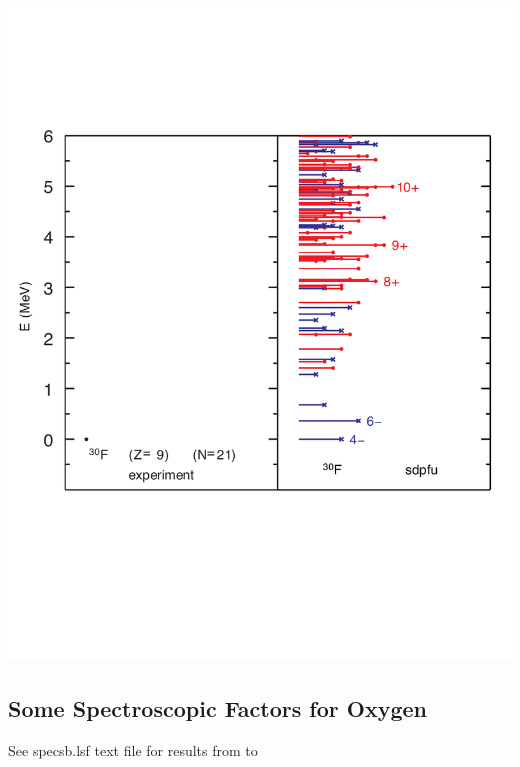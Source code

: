 \documentclass[12pt]{article}
\begin{document}
\includegraphics[width=\textwidth]{f_30u-allnfromd32.pdf}



\subsection{Some Spectroscopic Factors for Oxygen}

See specsb.lsf text file for results from  to 
\end{document}
